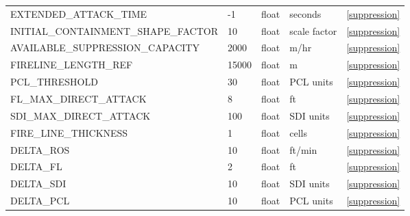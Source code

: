 \begin{landscape}
\begin{center}
\begin{longtable}{lllll}
EXTENDED\_ATTACK\_TIME                  & -1                         & float                  & seconds                            & \ref{suppression}                    \\
INITIAL\_CONTAINMENT\_SHAPE\_FACTOR     & 10                         & float                  & scale factor                       & \ref{suppression}                    \\
AVAILABLE\_SUPPRESSION\_CAPACITY        & 2000                       & float                  & m/hr                               & \ref{suppression}                    \\
FIRELINE\_LENGTH\_REF                   & 15000                      & float                  & m                                  & \ref{suppression}                    \\
PCL\_THRESHOLD                          & 30                         & float                  & PCL units                          & \ref{suppression}                    \\
FL\_MAX\_DIRECT\_ATTACK                 & 8                          & float                  & ft                                 & \ref{suppression}                    \\
SDI\_MAX\_DIRECT\_ATTACK                & 100                        & float                  & SDI units                          & \ref{suppression}                    \\
FIRE\_LINE\_THICKNESS                   & 1                          & float                  & cells                              & \ref{suppression}                    \\
DELTA\_ROS                              & 10                         & float                  & ft/min                             & \ref{suppression}                    \\
DELTA\_FL                               & 2                          & float                  & ft                                 & \ref{suppression}                    \\
DELTA\_SDI                              & 10                         & float                  & SDI units                          & \ref{suppression}                    \\
DELTA\_PCL                              & 10                         & float                  & PCL units                          & \ref{suppression}                    \\






\end{longtable}
\end{center}
\end{landscape}
